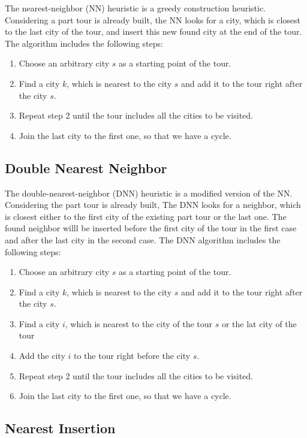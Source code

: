 \documentclass[a4paper, 12pt, headings=standardclasses]{scrartcl}
\begin{document}
The nearest-neighbor (NN) heuristic is a greedy construction heuristic.  Considering a part tour is already built, the NN  looks for a city, which is closest to the last city of the tour, and insert this new found city at the end of the tour.
The algorithm includes the following steps:
\begin{enumerate}
	\item Choose an arbitrary city $s$ as a starting point of the tour.
	\item  Find a city $k$, which is nearest to the city $s$ and add it to the tour right after the city $s$.
	\item Repeat step 2 until the tour includes all the cities to be visited.
	\item Join the last city to the first one, so that we have a cycle.
\end{enumerate}

\subsection{Double Nearest Neighbor}
The double-nearest-neighbor (DNN) heuristic is a modified version of the NN. Considering the part tour is already built, The DNN looks for a neighbor, which is closest either to the first city of the existing part tour or the last one. The found neighbor willl be inserted before the first city of the tour in the first case and after the last city in the second case.
The DNN algorithm includes the following steps:

\begin{enumerate}
	\item Choose an arbitrary city $s$ as a starting point of the tour.
	\item  Find a city $k$, which is nearest to the city $s$ and add it to the tour right after the city $s$.
	\item  Find a city $i$, which is nearest to the city of the tour $s$ or the lat city of the tour 
	\item  Add the city $i$ to the tour right before the city $s$.
	\item Repeat step 2 until the tour includes all the cities to be visited.
	\item Join the last city to the first one, so that we have a cycle.
\end{enumerate}
\subsection{Nearest Insertion}
\end{document}
